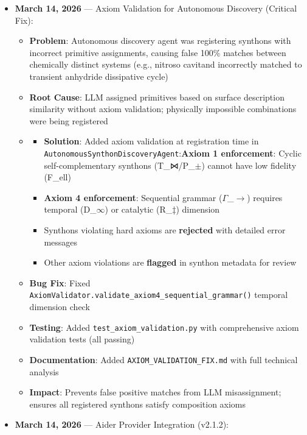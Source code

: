 \documentclass[12pt,a4paper]{article}
\begin{document}
\begin{itemize}
    \item 
    \textbf{March 14, 2026} --- Axiom Validation for Autonomous Discovery (Critical Fix):

    \begin{itemize}
    \item \textbf{Problem}: Autonomous discovery agent was registering synthons with incorrect primitive assignments, causing false 100\% matches between chemically distinct systems (e.g., nitroso cavitand incorrectly matched to transient anhydride dissipative cycle)
    \item \textbf{Root Cause}: LLM assigned primitives based on surface description similarity without axiom validation; physically impossible combinations were being registered
    \item 
    \begin{itemize}
    \item \textbf{Solution}: Added axiom validation at registration time in \texttt{AutonomousSynthonDiscoveryAgent}:\textbf{Axiom 1 enforcement}: Cyclic self-complementary synthons (T\_⋈/P\_$\pm$) cannot have low fidelity (F\_ell)
    \item \textbf{Axiom 4 enforcement}: Sequential grammar ($\Gamma$\_$\rightarrow$) requires temporal (D\_$\infty$) or catalytic (R\_‡) dimension
    \item Synthons violating hard axioms are \textbf{rejected} with detailed error messages
    \item Other axiom violations are \textbf{flagged} in synthon metadata for review
\end{itemize}

    \item \textbf{Bug Fix}: Fixed \texttt{AxiomValidator.validate\_axiom4\_sequential\_grammar()} temporal dimension check
    \item \textbf{Testing}: Added \texttt{test\_axiom\_validation.py} with comprehensive axiom validation tests (all passing)
    \item \textbf{Documentation}: Added \texttt{AXIOM\_VALIDATION\_FIX.md} with full technical analysis
    \item \textbf{Impact}: Prevents false positive matches from LLM misassignment; ensures all registered synthons satisfy composition axioms
\end{itemize}

    \item 
    \textbf{March 14, 2026} --- Aider Provider Integration (v2.1.2):


\end{itemize}
\end{document}
